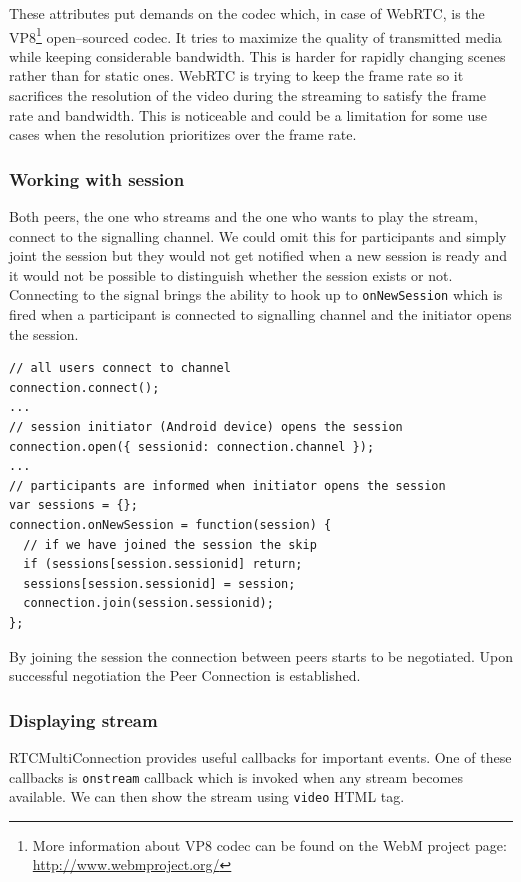 These attributes put demands on the codec which, in case of WebRTC, is the VP8\footnote{More information about VP8 codec can be found on the WebM project page: \url{http://www.webmproject.org/}} open--sourced codec. It tries to maximize the quality of transmitted media while keeping considerable bandwidth. This is harder for rapidly changing scenes rather than for static ones. WebRTC is trying to keep the frame rate so it sacrifices the resolution of the video during the streaming to satisfy the frame rate and bandwidth. This is noticeable and could be a limitation for some use cases when the resolution prioritizes over the frame rate.


\subsubsection{Working with session}
Both peers, the one who streams and the one who wants to play the stream, connect to the signalling channel. We could omit this for participants and simply joint the session but they would not get notified when a new session is ready and it would not be possible to distinguish whether the session exists or not. Connecting to the signal brings the ability to hook up to \verb!onNewSession! which is fired when a participant is connected to signalling channel and the initiator opens the session.

\begin{lstlisting}
// all users connect to channel
connection.connect();
...
// session initiator (Android device) opens the session
connection.open({ sessionid: connection.channel });
...
// participants are informed when initiator opens the session
var sessions = {};
connection.onNewSession = function(session) {
  // if we have joined the session the skip
  if (sessions[session.sessionid] return;
  sessions[session.sessionid] = session;
  connection.join(session.sessionid);
};
\end{lstlisting}

By joining the session the connection between peers starts to be negotiated. Upon successful negotiation the Peer Connection is established.


\subsubsection{Displaying stream}
RTCMultiConnection provides useful callbacks for important events. One of these callbacks is \verb!onstream! callback which is invoked when any stream becomes available. We can then show the stream using \verb!video! HTML tag.\\

